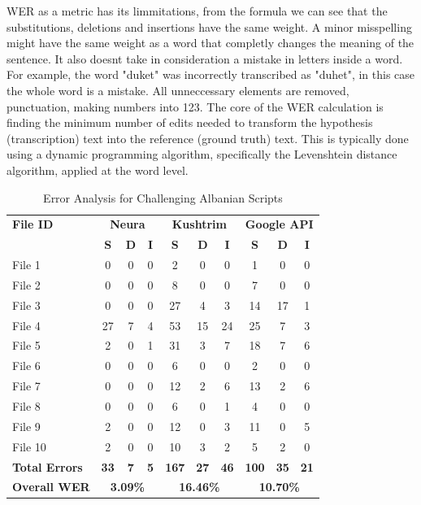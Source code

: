 \documentclass[12pt]{article}
\begin{document}
WER as a metric has its limmitations, from the formula we can see that the substitutions, deletions and insertions have the same weight. A minor misspelling might have the same weight as a word that completly changes the meaning of the sentence. It also doesnt take in consideration a mistake in letters inside a word. For example, the word "duket" was incorrectly transcribed as "duhet", in this case the whole word is a mistake. All unneccessary elements are removed, punctuation, making numbers into 123. The core of the WER calculation is finding the minimum number of edits needed to transform the hypothesis (transcription) text into the reference (ground truth) text. This is typically done using a dynamic programming algorithm, specifically the Levenshtein distance algorithm, applied at the word level.
\begin{table}[h!]
\centering
\caption{Error Analysis for Challenging Albanian Scripts}
\label{tab:firs_test}
\begin{tabular}{lccc|ccc|ccc}
\toprule
\textbf{File ID} & \multicolumn{3}{c}{\textbf{Neura}} & \multicolumn{3}{c}{\textbf{Kushtrim}} & \multicolumn{3}{c}{\textbf{Google API}} \\
\cmidrule(lr){2-4} \cmidrule(lr){5-7} \cmidrule(lr){8-10}
 & \textbf{S} & \textbf{D} & \textbf{I} & \textbf{S} & \textbf{D} & \textbf{I} & \textbf{S} & \textbf{D} & \textbf{I} \\
\midrule
File 1 & 0 & 0 & 0 & 2 & 0 & 0 & 1 & 0 & 0 \\
File 2 & 0 & 0 & 0 & 8 & 0 & 0 & 7 & 0 & 0 \\
File 3 & 0 & 0 & 0 & 27 & 4 & 3 & 14 & 17 & 1 \\
File 4 & 27 & 7 & 4 & 53 & 15 & 24 & 25 & 7 & 3 \\
File 5 & 2 & 0 & 1 & 31 & 3 & 7 & 18 & 7 & 6 \\
File 6 & 0 & 0 & 0 & 6 & 0 & 0 & 2 & 0 & 0 \\
File 7 & 0 & 0 & 0 & 12 & 2 & 6 & 13 & 2 & 6 \\
File 8 & 0 & 0 & 0 & 6 & 0 & 1 & 4 & 0 & 0 \\
File 9 & 2 & 0 & 0 & 12 & 0 & 3 & 11 & 0 & 5 \\
File 10 & 2 & 0 & 0 & 10 & 3 & 2 & 5 & 2 & 0 \\
\midrule
\textbf{Total Errors} & \textbf{33} & \textbf{7} & \textbf{5} & \textbf{167} & \textbf{27} & \textbf{46} & \textbf{100} & \textbf{35} & \textbf{21} \\
\textbf{Overall WER} & \multicolumn{3}{c}{\textbf{3.09\%}} & \multicolumn{3}{c}{\textbf{16.46\%}} & \multicolumn{3}{c}{\textbf{10.70\%}} \\
\bottomrule
\end{tabular}
\end{table}
\end{document}
